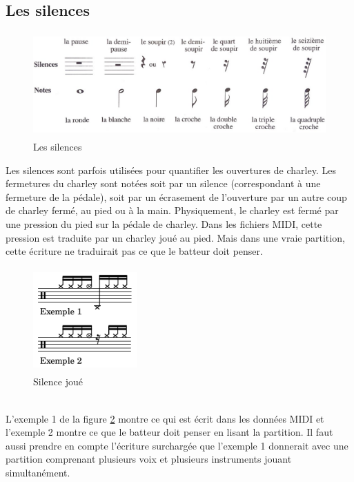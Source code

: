 \subsection*{Les silences}
\begin{figure}[h]
	\centering
	\includegraphics[height=40mm, width=125mm]{z_images/3_methodes/0_notation_de_la_batterie/4_silences.png}
	\caption{Les silences}
	\label{silences}
\end{figure}
Les silences sont parfois utilisées pour quantifier les ouvertures de charley. Les fermetures du charley sont notées soit par un silence (correspondant à une fermeture de la pédale), soit par un écrasement de l’ouverture par un autre coup de charley fermé, au pied ou à la main.
Physiquement, le charley est fermé par une pression du pied sur la pédale de charley. Dans les fichiers MIDI, cette pression est traduite par un charley joué au pied. Mais dans une vraie partition, cette écriture ne traduirait pas ce que le batteur doit penser.
\begin{figure}[h]
	\centering
	\includegraphics[height=40mm, width=40mm]{z_images/3_methodes/0_notation_de_la_batterie/5_silence_joue.png}
	\caption{Silence joué}
	\label{silence joue}
\end{figure}\\
L’exemple 1 de la figure \ref{silence joue} montre ce qui est écrit dans les données MIDI et l’exemple 2 montre ce que le batteur doit penser en lisant la partition. Il faut aussi prendre en compte l’écriture surchargée que l’exemple 1 donnerait avec une partition comprenant plusieurs voix et plusieurs instruments jouant simultanément.
